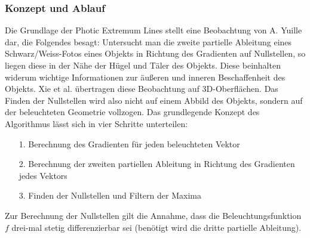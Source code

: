\documentclass{paperStyle}
\begin{document}
\subsubsection{Konzept und Ablauf}
\label{defpel}
Die Grundlage der Photic Extremum Lines stellt eine Beobachtung von A. Yuille dar, die Folgendes besagt: Untersucht man die zweite partielle Ableitung eines Schwarz/Weiss-Fotos eines Objekts in Richtung des Gradienten auf Nullstellen, so liegen diese in der Nähe der Hügel und Täler des Objekts. Diese beinhalten widerum wichtige Informationen zur äußeren und inneren Beschaffenheit des Objekts. Xie et al. übertragen diese Beobachtung auf 3D-Oberflächen. Das Finden der Nullstellen wird also nicht auf einem Abbild des Objekts, sondern auf der beleuchteten Geometrie vollzogen.
Das grundlegende Konzept des Algorithmus lässt sich in vier Schritte unterteilen:
\begin{itemize}
\item[1.] Berechnung des Gradienten für jeden beleuchteten Vektor
\item[2.] Berechnung der zweiten partiellen Ableitung in Richtung des Gradienten jedes Vektors
\item[3.] Finden der Nullstellen und Filtern der Maxima
\end{itemize}
Zur Berechnung der Nullstellen gilt die Annahme, dass die Beleuchtungsfunktion $f$ drei-mal stetig differenzierbar sei (benötigt wird die dritte partielle Ableitung). 
\end{document}
